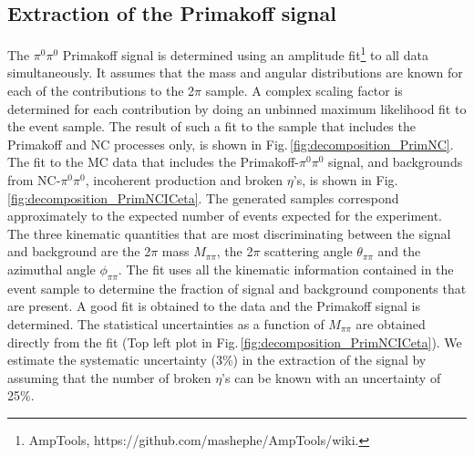 \subsection{Extraction of the Primakoff signal \label{sec:signalfit}}
The $\pi^0\pi^0$ Primakoff signal is determined using an amplitude fit\footnote{AmpTools, https://github.com/mashephe/AmpTools/wiki.} to all data simultaneously. It assumes that the mass and angular distributions are known for each of the contributions to the 2$\pi$ sample. A complex scaling factor is determined for each contribution by doing an unbinned maximum likelihood fit to the event sample. The result of such a fit to the sample that includes the Primakoff and NC processes only, is shown in  Fig.\,\ref{fig:decomposition_PrimNC}. The fit to the MC data that includes the Primakoff-$\pi^0\pi^0$ signal, and backgrounds from NC-$\pi^0\pi^0$, incoherent production and broken $\eta$'s, is shown in Fig.\,\ref{fig:decomposition_PrimNCICeta}. The generated samples correspond approximately to the expected number of events expected for the experiment. The three kinematic quantities that are most discriminating between the signal and background are the 2$\pi$ mass $M_{\pi\pi}$, the 2$\pi$ scattering angle $\theta_{\pi\pi}$ and the azimuthal angle $\phi_{\pi\pi}$. The fit uses all the kinematic information contained in the event sample to determine the fraction of signal and background components that are present. A good fit is obtained to the data and the Primakoff signal is determined. The statistical uncertainties as a function of $M_{\pi\pi}$ are obtained directly from the fit (Top left plot in Fig.\,\ref{fig:decomposition_PrimNCICeta}). We estimate the systematic uncertainty (3\%) in the extraction of the signal by
assuming that the number of broken $\eta$'s can be known with an uncertainty of 25\%.


